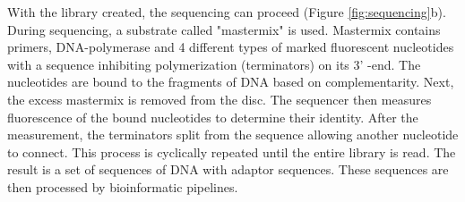 With the library created, the sequencing can proceed (Figure \ref{fig:sequencing}b). During sequencing, a substrate called "mastermix" is used. Mastermix contains primers, DNA-polymerase and 4 different types of marked fluorescent nucleotides with a sequence inhibiting polymerization (terminators) on its 3' -end. The nucleotides are bound to the fragments of DNA based on complementarity. Next, the excess mastermix is removed from the disc. The sequencer then measures fluorescence of the bound nucleotides to determine their identity. After the measurement, the terminators split from the sequence allowing another nucleotide to connect. This process is cyclically repeated until the entire library is read. The result is a set of sequences of DNA with adaptor sequences. These sequences are then processed by bioinformatic pipelines.
